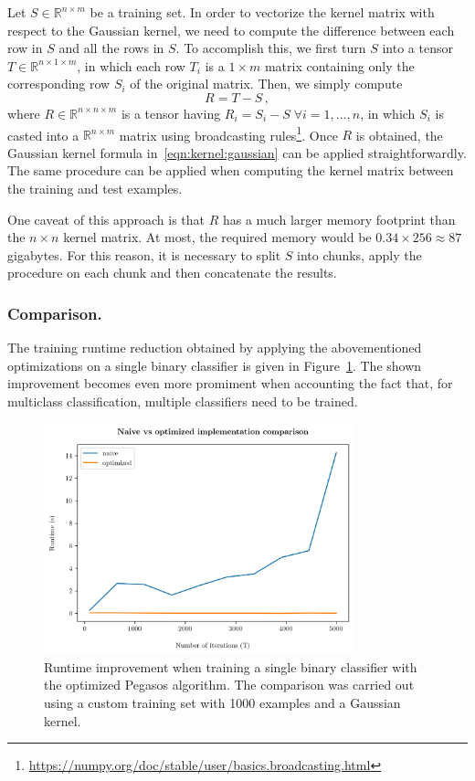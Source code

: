 \documentclass[runningheads]{llncs}
\begin{document}
Let $S \in \mathbb{R}^{n \times m}$ be a training set. In order to vectorize the kernel matrix with respect to the Gaussian kernel, we need to compute the difference between each row in $S$ and all the rows in $S$. To accomplish this, we first turn $S$ into a tensor $T \in \mathbb{R}^{n \times 1 \times m}$, in which each row $T_i$ is a $1 \times m$ matrix containing only the corresponding row $S_i$ of the original matrix. Then, we simply compute
\[
  R = T - S \, ,
\]
where $R \in \mathbb{R}^{n \times n \times m}$ is a tensor having $R_i = S_i - S \; \forall i=1,\dots,n$, in which $S_i$ is casted into a $\mathbb{R}^{n \times m}$ matrix using broadcasting rules\footnote{\url{https://numpy.org/doc/stable/user/basics.broadcasting.html}}. Once $R$ is obtained, the Gaussian kernel formula in~\ref{eqn:kernel:gaussian} can be applied straightforwardly. The same procedure can be applied when computing the kernel matrix between the training and test examples.

One caveat of this approach is that $R$ has a much larger memory footprint than the $n \times n$ kernel matrix. At most, the required memory would be $0.34 \times 256 \approx 87$ gigabytes. For this reason, it is necessary to split $S$ into chunks, apply the procedure on each chunk and then concatenate the results.

\subsubsection{Comparison.} The training runtime reduction obtained by applying the abovementioned optimizations on a single binary classifier is given in Figure~\ref{fig:algorithm:runtime}. The shown improvement becomes even more promiment when accounting the fact that, for multiclass classification, multiple classifiers need to be trained.

\begin{figure}
  \center
  \includegraphics[width=0.8\textwidth]{../img/runtime.png}
  \caption{Runtime improvement when training a single binary classifier with the optimized Pegasos algorithm. The comparison was carried out using a custom training set with 1000 examples and a Gaussian kernel.} 
  \label{fig:algorithm:runtime}
\end{figure}
\end{document}

